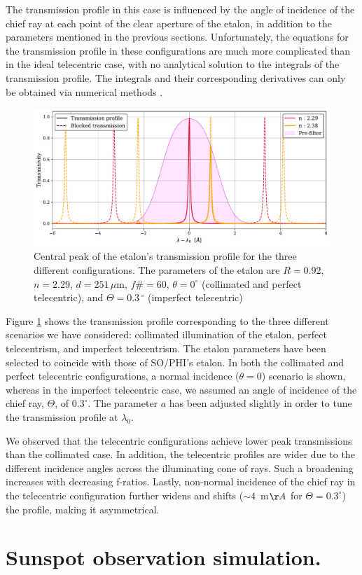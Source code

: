The transmission profile in this case is influenced by the angle of incidence of the chief ray at each point of the clear aperture of the etalon, in addition to the parameters mentioned in the previous sections. Unfortunately, the equations for the transmission profile in these configurations are much more complicated than in the ideal telecentric case, with no analytical solution to the integrals of the transmission profile. The integrals and their corresponding derivatives can only be obtained via numerical methods \citep{franI}. 
\begin{figure}
    \centering
    \includegraphics[width = \textwidth]{figures/Introduction_to_spectropolarimeters/Etalon_and_prefilter_example.pdf}
    \caption{Central peak of the etalon's transmission profile for the three different configurations. The parameters of the etalon are $R = 0.92$, $n = 2.29$, $d = 251 \, \mu \mathrm{m}$, $f\#=60$, $\theta = 0 ^{\circ}$ (collimated and perfect telecentric), and $\Theta = 0.3\,^{\circ}$ (imperfect telecentric)}
    \label{fig:Profiles-configs}
\end{figure}

Figure \ref{fig:Profiles-configs} shows the transmission profile corresponding to the three different scenarios we have considered: collimated illumination of the etalon, perfect telecentrism, and imperfect telecentrism. The etalon parameters have been selected to coincide with those of SO/PHI's etalon. In both the collimated and perfect telecentric configurations, a normal incidence  ($\theta = 0$) scenario is shown, whereas in the imperfect telecentric case, we assumed an angle of incidence of the chief ray, $\Theta$, of $0.3^{\circ}$. The parameter $a$ has been adjusted slightly in order to tune the transmission profile at $\lambda _ 0$.

We observed that the telecentric configurations achieve lower peak transmissions than the collimated case. In addition, the telecentric profiles are wider due to the different incidence angles across the illuminating cone of rays. Such a broadening increases with decreasing f-ratios. Lastly, non-normal incidence of the chief ray in the telecentric configuration further widens and shifts ($\sim 4$~m$\AA$ for $\Theta=0.3^\circ$) the profile, making it asymmetrical. 



\section{Sunspot observation simulation.}